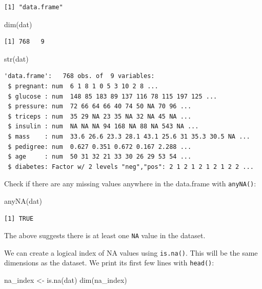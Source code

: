 \documentclass[
]{book}
\newenvironment{Shaded}{\begin{snugshade}}{\end{snugshade}}
\newcommand{\FunctionTok}[1]{\textcolor[rgb]{0.00,0.00,0.00}{#1}}
\newcommand{\NormalTok}[1]{#1}
\newcommand{\OtherTok}[1]{\textcolor[rgb]{0.56,0.35,0.01}{#1}}
\begin{document}
\begin{verbatim}
[1] "data.frame"
\end{verbatim}

\begin{Shaded}
\begin{Highlighting}[]
\FunctionTok{dim}\NormalTok{(dat)}
\end{Highlighting}
\end{Shaded}

\begin{verbatim}
[1] 768   9
\end{verbatim}

\begin{Shaded}
\begin{Highlighting}[]
\FunctionTok{str}\NormalTok{(dat)}
\end{Highlighting}
\end{Shaded}

\begin{verbatim}
'data.frame':   768 obs. of  9 variables:
 $ pregnant: num  6 1 8 1 0 5 3 10 2 8 ...
 $ glucose : num  148 85 183 89 137 116 78 115 197 125 ...
 $ pressure: num  72 66 64 66 40 74 50 NA 70 96 ...
 $ triceps : num  35 29 NA 23 35 NA 32 NA 45 NA ...
 $ insulin : num  NA NA NA 94 168 NA 88 NA 543 NA ...
 $ mass    : num  33.6 26.6 23.3 28.1 43.1 25.6 31 35.3 30.5 NA ...
 $ pedigree: num  0.627 0.351 0.672 0.167 2.288 ...
 $ age     : num  50 31 32 21 33 30 26 29 53 54 ...
 $ diabetes: Factor w/ 2 levels "neg","pos": 2 1 2 1 2 1 2 1 2 2 ...
\end{verbatim}

Check if there are any missing values anywhere in the data.frame with \texttt{anyNA()}:

\begin{Shaded}
\begin{Highlighting}[]
\FunctionTok{anyNA}\NormalTok{(dat)}
\end{Highlighting}
\end{Shaded}

\begin{verbatim}
[1] TRUE
\end{verbatim}

The above suggests there is at least one \texttt{NA} value in the dataset.

We can create a logical index of NA values using \texttt{is.na()}. This will be the same dimensions as the dataset. We print its first few lines with \texttt{head()}:

\begin{Shaded}
\begin{Highlighting}[]
\NormalTok{na\_index }\OtherTok{\textless{}{-}} \FunctionTok{is.na}\NormalTok{(dat)}
\FunctionTok{dim}\NormalTok{(na\_index)}
\end{Highlighting}
\end{Shaded}
\end{document}
